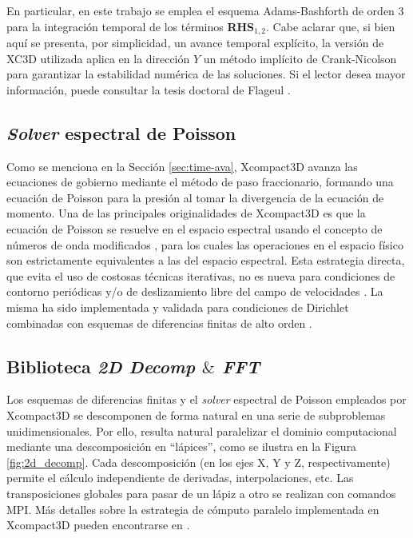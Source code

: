 En particular, en este trabajo se emplea el esquema Adams-Bashforth de orden 3 para la integración temporal de los términos \textbf{RHS}$_{1,2}$. Cabe aclarar que, si bien aquí se presenta, por simplicidad, un avance temporal explícito, la versión de XC3D utilizada aplica en la dirección $Y$ un método implícito de Crank-Nicolson para garantizar la estabilidad numérica de las soluciones. Si el lector desea mayor información, puede consultar la tesis doctoral de Flageul \cite{flageul2015creation}.



\subsection{\textit{Solver} espectral de Poisson}

Como se menciona en la Sección \ref{sec:time-ava}, Xcompact3D avanza las ecuaciones de gobierno mediante el método de paso fraccionario, formando una ecuación de Poisson para la presión al tomar la divergencia de la ecuación de momento. Una de las principales originalidades de Xcompact3D es que la ecuación de Poisson se resuelve en el espacio espectral usando el concepto de números de onda modificados \cite{lele1992compact}, para los cuales las operaciones en el espacio físico son estrictamente equivalentes a las del espacio espectral. Esta estrategia directa, que evita el uso de costosas técnicas iterativas, no es nueva para condiciones de contorno periódicas y/o de deslizamiento libre del campo de velocidades \cite{schumann1976direct}. La misma ha sido implementada y validada para condiciones de Dirichlet combinadas con esquemas de diferencias finitas de alto orden \cite{laizet2009high}.

\subsection{Biblioteca \textit{2D Decomp $\&$ FFT}}

Los esquemas de diferencias finitas y el \textit{solver} espectral de Poisson empleados por \linebreak Xcompact3D se descomponen de forma natural en una serie de subproblemas unidimensionales. Por ello, resulta natural paralelizar el dominio computacional mediante una descomposición en “lápices”, como se ilustra en la Figura \ref{fig:2d_decomp}. Cada descomposición (en los ejes X, Y y Z, respectivamente) permite el cálculo independiente de derivadas, interpolaciones, etc. Las transposiciones globales para pasar de un lápiz a otro se realizan con comandos MPI. Más detalles sobre la estrategia de cómputo paralelo implementada en Xcompact3D pueden \linebreak encontrarse en \cite{laizet2011incompact3d}.



